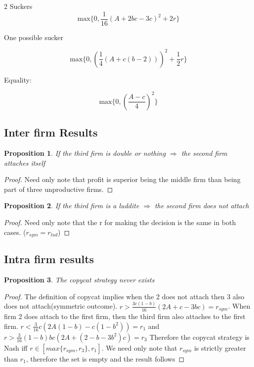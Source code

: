 \documentclass{article}
\newtheorem{proposition}{Proposition}
\begin{document}
2 Suckers
\begin{equation*}
\text{max} \{ 
0, \frac{1}{16} (A+2 b c-3 c)^2 + 2r
\}
\end{equation*}

One possible sucker

\begin{equation*}
\text{max} \{ 
0, \left(\frac{1}{4}(A+ c(b-2)) \right)^2+\frac{1}{2}r
\}
\end{equation*}

Equality:

\begin{equation*}
\text{max} \{ 
0, \left(\frac{A-c}{4} \right)^2
\}
\end{equation*}

\subsection{Inter firm Results}


\begin{proposition}
If the third firm is double or nothing $\Rightarrow$ the second firm attaches itself
\end{proposition}

\begin{proof}
Need only note that profit is superior being the middle firm than being part of three unproductive firms.
\end{proof}

\begin{proposition} \label{symislud}
If the third firm is a luddite $\Rightarrow$ the second firm does not attach
\end{proposition}

\begin{proof}
Need only note that the r for making the decision is the same in both cases. ($r_{sym}=r_{lud}$)
\end{proof}




\subsection{Intra firm results}

\begin{proposition}
The copycat strategy never exists
\end{proposition}

\begin{proof}
The definition of copycat implies when the 2 does not attach then 3 also does not attach(symmetric outcome). $r > \frac{3 c(1-b)}{16}(2A+c-3bc)=r_{sym}$. When firm 2 does attach to the first firm, then the third firm also attaches to the first firm. $r< \frac{3}{16} c \left(2 A (1-b)-c(1-b^2 ) \right)=r_{1}$ and $r > \frac{3}{16} (1 - b) b c (2 A + (2 - b - 3 b^2) c)=r_{3} $ Therefore the copycat strategy is Nash iff $r \in [max\{r_{sym}, r_{3} \}, r_{1}]$. We need only note that $r_{sym}$ is strictly greater than $r_{1}$, therefore the set is empty and the result follows
\end{proof}
\end{document}
